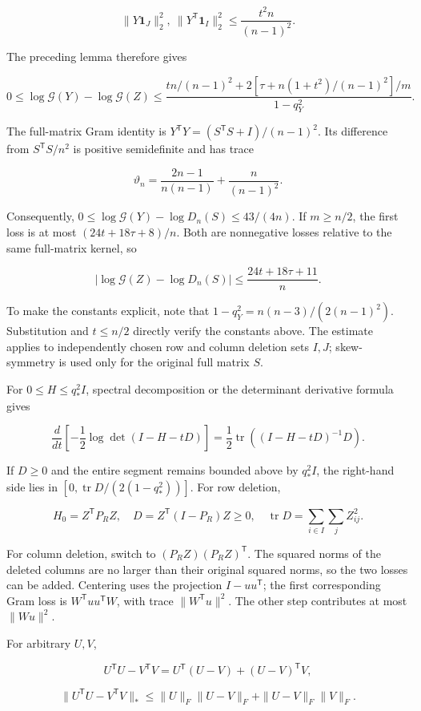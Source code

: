 \documentclass[11pt,a4paper]{article}
\begin{document}
\[
\|Y\mathbf 1_J\|_2^2,\ \|Y^{\mathsf T}\mathbf 1_I\|_2^2\le\frac{t^2n}{(n-1)^2}.
\]

The preceding lemma therefore gives

\[
0\le\log\mathcal G(Y)-\log\mathcal G(Z)\le\frac{t n/(n-1)^2+2[\tau+n(1+t^2)/(n-1)^2]/m}{1-q_Y^2}.
\]

The full-matrix Gram identity is \(Y^{\mathsf T}Y=(S^{\mathsf T}S+I)/(n-1)^2\). Its difference from \(S^{\mathsf T}S/n^2\) is positive semidefinite and has trace

\[
\vartheta_n=\frac{2n-1}{n(n-1)}+\frac n{(n-1)^2}.
\]

Consequently, \(0\le\log\mathcal G(Y)-\log D_n(S)\le43/(4n)\). If \(m\ge n/2\), the first loss is at most \((24t+18\tau+8)/n\). Both are nonnegative losses relative to the same full-matrix kernel, so

\[
|\log\mathcal G(Z)-\log D_n(S)|\le\frac{24t+18\tau+11}{n}.
\]

To make the constants explicit, note that \(1-q_Y^2=n(n-3)/(2(n-1)^2)\). Substitution and \(t\le n/2\) directly verify the constants above. The estimate applies to independently chosen row and column deletion sets \(I,J\); skew-symmetry is used only for the original full matrix \(S\).

For \(0\le H\le q_*^2I\), spectral decomposition or the determinant derivative formula gives

\[
\frac{d}{dt}\left[-\frac12\log\det(I-H-tD)\right]
=\frac12\operatorname{tr}((I-H-tD)^{-1}D).
\]

If \(D\ge0\) and the entire segment remains bounded above by \(q_*^2I\), the right-hand side lies in \([0,\operatorname{tr}D/(2(1-q_*^2))]\). For row deletion,

\[
H_0=Z^{\mathsf T}P_RZ,\quad
D=Z^{\mathsf T}(I-P_R)Z\ge0,\quad
\operatorname{tr}D=\sum_{i\in I}\sum_jZ_{ij}^2.
\]

For column deletion, switch to \((P_RZ)(P_RZ)^{\mathsf T}\). The squared norms of the deleted columns are no larger than their original squared norms, so the two losses can be added. Centering uses the projection \(I-uu^{\mathsf T}\); the first corresponding Gram loss is \(W^{\mathsf T}uu^{\mathsf T}W\), with trace \(\|W^{\mathsf T}u\|^2\). The other step contributes at most \(\|Wu\|^2\).

For arbitrary \(U,V\),

\[
U^{\mathsf T}U-V^{\mathsf T}V
=U^{\mathsf T}(U-V)+(U-V)^{\mathsf T}V,
\]

\[
\|U^{\mathsf T}U-V^{\mathsf T}V\|_*
\le\|U\|_F\|U-V\|_F+\|U-V\|_F\|V\|_F.
\]
\end{document}
